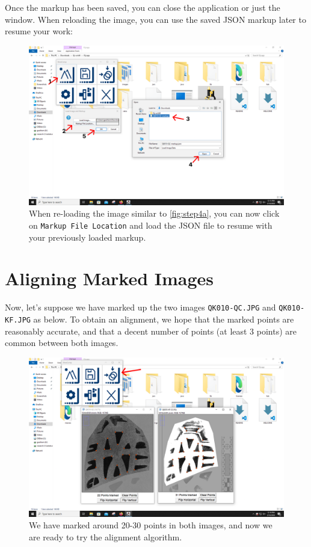\documentclass{csafedoc}
\begin{document}
Once the markup has been saved, you can close the application or just the window. When
reloading the image, you can use the saved JSON markup later to resume your work:

\begin{figure}[H]
	\begin{center}
		\includegraphics[width=0.8\linewidth]{images/step_5b-anno.png}
	\end{center}
	\caption{When re-loading the image similar to \autoref{fig:step4a}, you can now click on \texttt{Markup File Location} and load the JSON file to resume with your previously loaded markup.}
	\label{fig:step5b}
\end{figure}

\section{Aligning Marked Images}%

Now, let's suppose we have marked up the two images \texttt{QK010-QC.JPG} and
\texttt{QK010-KF.JPG} as below. To obtain an alignment, we hope that the marked points are
reasonably accurate, and that a decent number of points (at least 3 points) are common
between both images.

\begin{figure}[H]
	\begin{center}
		\includegraphics[width=0.8\linewidth]{images/step_6-anno.png}
	\end{center}
	\caption{We have marked around 20-30 points in both images, and now we are ready to try the alignment algorithm.}
	\label{fig:step6}
\end{figure}
\end{document}
